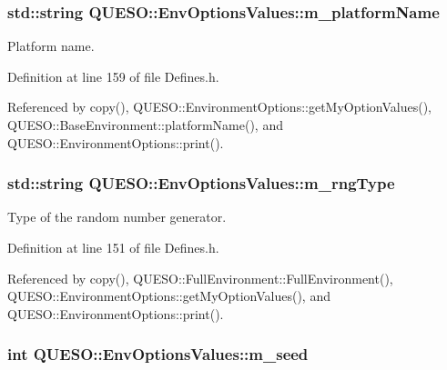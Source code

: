 \hypertarget{class_q_u_e_s_o_1_1_env_options_values_aaecd649e9d424572e66db71533af1913}{
\subsubsection[{m\-\_\-platform\-Name}]{\setlength{\rightskip}{0pt plus 5cm}std\-::string Q\-U\-E\-S\-O\-::\-Env\-Options\-Values\-::m\-\_\-platform\-Name}}\label{class_q_u_e_s_o_1_1_env_options_values_aaecd649e9d424572e66db71533af1913}


Platform name. 



Definition at line 159 of file Defines.\-h.



Referenced by copy(), Q\-U\-E\-S\-O\-::\-Environment\-Options\-::get\-My\-Option\-Values(), Q\-U\-E\-S\-O\-::\-Base\-Environment\-::platform\-Name(), and Q\-U\-E\-S\-O\-::\-Environment\-Options\-::print().

\hypertarget{class_q_u_e_s_o_1_1_env_options_values_a01502ec46080bf43c99d55646e6a1b7f}{
\subsubsection[{m\-\_\-rng\-Type}]{\setlength{\rightskip}{0pt plus 5cm}std\-::string Q\-U\-E\-S\-O\-::\-Env\-Options\-Values\-::m\-\_\-rng\-Type}}\label{class_q_u_e_s_o_1_1_env_options_values_a01502ec46080bf43c99d55646e6a1b7f}


Type of the random number generator. 



Definition at line 151 of file Defines.\-h.



Referenced by copy(), Q\-U\-E\-S\-O\-::\-Full\-Environment\-::\-Full\-Environment(), Q\-U\-E\-S\-O\-::\-Environment\-Options\-::get\-My\-Option\-Values(), and Q\-U\-E\-S\-O\-::\-Environment\-Options\-::print().

\hypertarget{class_q_u_e_s_o_1_1_env_options_values_adf0629a19e30b4f907b2e5fc90c9830a}{
\subsubsection[{m\-\_\-seed}]{\setlength{\rightskip}{0pt plus 5cm}int Q\-U\-E\-S\-O\-::\-Env\-Options\-Values\-::m\-\_\-seed}}\label{class_q_u_e_s_o_1_1_env_options_values_adf0629a19e30b4f907b2e5fc90c9830a}


